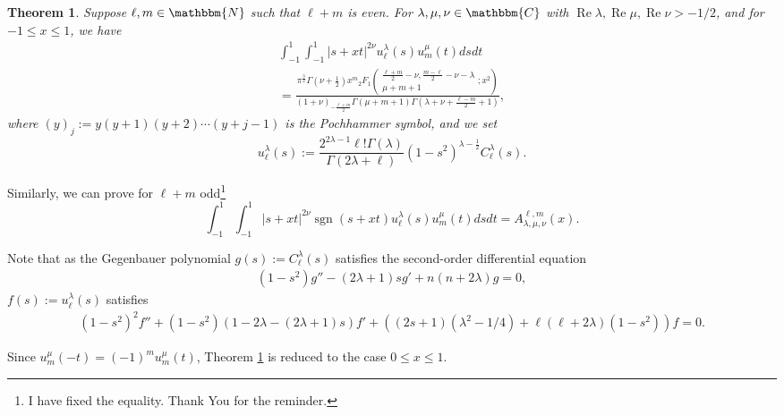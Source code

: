 \documentclass[12pt]{article}
\numberwithin{equation}{section}
\newcommand{\assign}{:=}
\newcommand{\tmop}[1]{\ensuremath{\operatorname{#1}}}
\newtheorem{theorem}[corollary]{Theorem}
\begin{document}
\begin{theorem}
  \label{main-thm}Suppose $\ell, m \in \mathbbm{N}$ such that $\ell + m$ is
  even. For $\lambda, \mu, \nu \in \mathbbm{C}$ with $\tmop{Re} \lambda,
  \tmop{Re} \mu, \tmop{Re} \nu > - 1 / 2$, and for $- 1 \leqslant x \leqslant
  1$, we have
  \begin{multline}
     \displaystyle\int_{- 1}^1 \displaystyle\int_{- 1}^1 | s + xt |^{2 \nu} u_{\ell}^{\lambda} (s)
    u_m^{\mu} (t) d s d t   \\
     \displaystyle= \frac{
    \pi^{\frac{3}{2}} \Gamma \left( \nu + \frac{1}{2} \right) x^m{}_2 F_1
    \left( \begin{array}{c}
      \frac{\ell + m}{2} - \nu, \frac{m - \ell}{2} - \nu - \lambda\\
      \mu + m + 1
    \end{array} ; x^2 \right)}{(1+\nu)_{-\frac{\ell+m}{2}}\Gamma (\mu + m + 1) \Gamma \left( \lambda +
    \nu + \frac{\ell - m}{2} + 1 \right)},  \label{eqn:main}  
  \end{multline}
  where $(y)_j \assign y (y + 1) (y + 2) \cdots (y + j - 1)$ is the Pochhammer 
  symbol, and we set
\[ u_{\ell}^{\lambda} (s) \assign \frac{2^{2 \lambda - 1} \ell ! \Gamma
   (\lambda)}{\Gamma (2 \lambda + \ell)} (1 - s^2)^{\lambda - \frac{1}{2}}
   C_{\ell}^{\lambda} (s) . \]
\end{theorem}
\begin{remark}
	Similarly, we can prove for $\ell+m$ odd\footnote{I have fixed the equality. Thank You for the reminder.}
	\begin{equation*}
		\displaystyle\int_{- 1}^1 \displaystyle\int_{- 1}^1 | s + xt |^{2 \nu}\operatorname{sgn}\left( s+xt \right) u_{\ell}^{\lambda} (s)
		u_m^{\mu} (t) d s d t=A^{\ell,m}_{\lambda,\mu,\nu}(x).
	\end{equation*}
\end{remark}

Note that as the Gegenbauer polynomial $g (s) \assign C_{\ell}^{\lambda} (s)$
satisfies the second-order differential equation
\begin{eqnarray}
  & (1 - s^2) g'' - (2 \lambda + 1) s g' + n (n + 2 \lambda) g = 0, & 
  \nonumber
\end{eqnarray}
$f (s) \assign u_{\ell}^{\lambda} (s)$ satisfies
\begin{eqnarray}
  & (1 - s^2)^2 f'' + (1 - s^2) (1 - 2 \lambda - (2 \lambda + 1) s) f' + ((2
  s + 1) (\lambda^2 - 1 / 4) + \ell (\ell + 2 \lambda) (1 - s^2)) f = 0. & 
  \nonumber
\end{eqnarray}
\begin{remark}
  Since $u_m^{\mu} (- t) = (- 1)^m u_m^{\mu} (t)$, Theorem \ref{main-thm} is
  reduced to the case $0 \leqslant x \leqslant 1$.
\end{remark}
\end{document}

